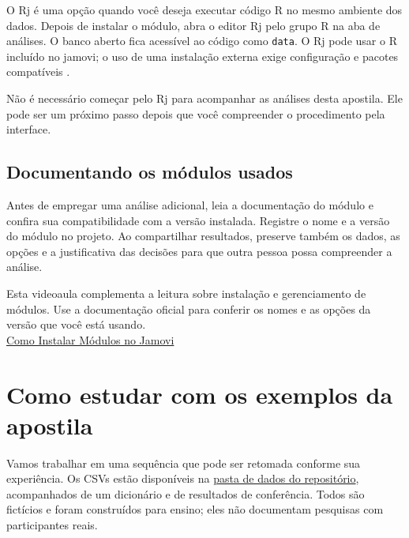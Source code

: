 O Rj é uma opção quando você deseja executar código R no mesmo ambiente dos dados. Depois de instalar o módulo, abra o editor Rj pelo grupo R na aba de análises. O banco aberto fica acessível ao código como \texttt{data}. O Rj pode usar o R incluído no jamovi; o uso de uma instalação externa exige configuração e pacotes compatíveis \parencite{JamoviR}.

Não é necessário começar pelo Rj para acompanhar as análises desta apostila. Ele pode ser um próximo passo depois que você compreender o procedimento pela interface.

\subsection{Documentando os módulos usados}

Antes de empregar uma análise adicional, leia a documentação do módulo e confira sua compatibilidade com a versão instalada. Registre o nome e a versão do módulo no projeto. Ao compartilhar resultados, preserve também os dados, as opções e a justificativa das decisões para que outra pessoa possa compreender a análise.

\begin{tcolorbox}[colback=white,colframe=green,title={Dica de Conteúdo}]
Esta videoaula complementa a leitura sobre instalação e gerenciamento de módulos. Use a documentação oficial para conferir os nomes e as opções da versão que você está usando.\\
\faYoutube{} \href{https://youtu.be/qBeRMNldzgs?si=TRYPqcPQeUFthNuo}{Como Instalar Módulos no Jamovi}
\end{tcolorbox}

\section{Como estudar com os exemplos da apostila}

Vamos trabalhar em uma sequência que pode ser retomada conforme sua experiência. Os CSVs estão disponíveis na \href{https://github.com/erickfaria/apostilaJamovi/tree/main/dados}{pasta de dados do repositório}, acompanhados de um dicionário e de resultados de conferência. Todos são fictícios e foram construídos para ensino; eles não documentam pesquisas com participantes reais.

